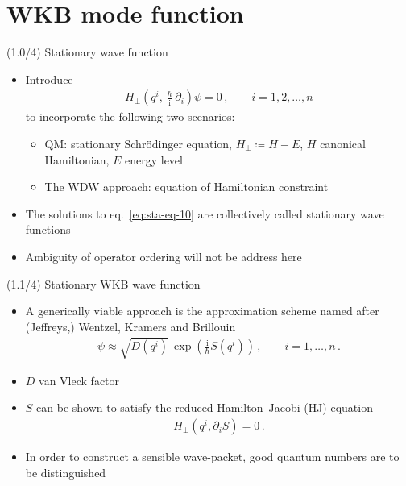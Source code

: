 \documentclass[mathserif]{beamer}
\newcommand{\rfun}[2]{#1\mathopen{}\left(#2\right)\mathclose{}}
\newcommand\mi{\mathrm{i}} %
\begin{document}
\section{WKB mode function}


\begin{frame}{(1.0/4) Stationary wave function}
\begin{itemize}
\item
Introduce
\begin{align}
 \rfun{H_\perp}{q^i, \tfrac{\hslash}{\mi}\partial_i} \psi = 0\,,\qquad
 i = 1, 2, \ldots, n
 \label{eq:sta-eq-10}
\end{align}
to incorporate the following two scenarios:
\begin{itemize}
    \item QM: stationary Schr\"odinger equation, $H_\perp \coloneqq H - E$, $H$ canonical Hamiltonian, $E$ energy level
    \item The WDW approach: equation of Hamiltonian constraint
\end{itemize}
\item
The solutions to eq.\ \eqref{eq:sta-eq-10} are collectively called \alert{stationary wave functions}
\item
Ambiguity of operator ordering will not be address here
\end{itemize}
\end{frame}

\begin{frame}{(1.1/4) Stationary WKB wave function}
\begin{itemize}
\item A generically viable approach is the approximation scheme named after
(Jeffreys,) Wentzel, Kramers and Brillouin
    \begin{align}
    \psi \approx \sqrt{\rfun{D}{q^i}}\,
    \rfun{\exp}{\tfrac{\mi}{\hslash} \rfun{S}{q^i}}\,,
    \qquad
    i = 1, \ldots, n\,.
\end{align}
    \item $D$ van Vleck factor
    \item $S$ can be shown to satisfy the reduced Hamilton--Jacobi (HJ) equation
\begin{align}
    \rfun{H_\perp}{q^i, \partial_i S} = 0\,.
    \label{eq:packet-100}
\end{align}
    \item
    In order to construct a sensible wave-packet, \alert{good quantum numbers} are to be distinguished
\end{itemize}
\end{frame}
\end{document}
